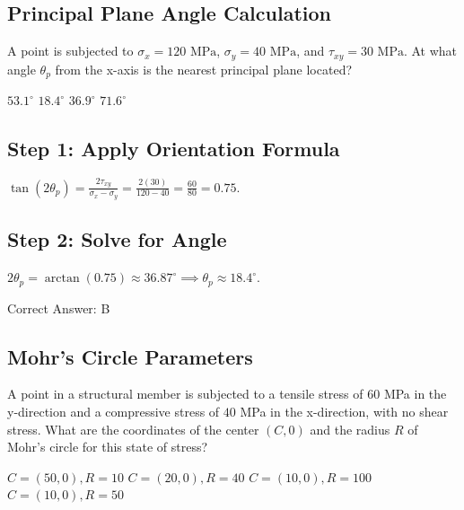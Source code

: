 \clearpage

\subsection{Principal Plane Angle Calculation}

A point is subjected to $\sigma_{x} = 120\text{ MPa}$, $\sigma_{y} = 40\text{ MPa}$, and $\tau_{xy} = 30\text{ MPa}$. At what angle $\theta_p$ from the x-axis is the nearest principal plane located?

\begin{choices}
    \choice $53.1^{\circ}$
    \correctchoice $18.4^{\circ}$
    \choice $36.9^{\circ}$
    \choice $71.6^{\circ}$
\end{choices}

\begin{solution}

\subsection*{Step 1: Apply Orientation Formula}
$\tan(2\theta_p) = \frac{2\tau_{xy}}{\sigma_x - \sigma_y} = \frac{2(30)}{120 - 40} = \frac{60}{80} = 0.75$.

\subsection*{Step 2: Solve for Angle}
$2\theta_p = \arctan(0.75) \approx 36.87^{\circ} \implies \theta_p \approx 18.4^{\circ}$.

Correct Answer: B
\end{solution}

\clearpage

\subsection{Mohr's Circle Parameters}

A point in a structural member is subjected to a tensile stress of $60$ MPa in the y-direction and a compressive stress of $40$ MPa in the x-direction, with no shear stress. What are the coordinates of the center $(C, 0)$ and the radius $R$ of Mohr's circle for this state of stress?

\begin{choices}
    \choice $C = (50, 0), R = 10$
    \choice $C = (20, 0), R = 40$
    \choice $C = (10, 0), R = 100$
    \correctchoice $C = (10, 0), R = 50$
\end{choices}

